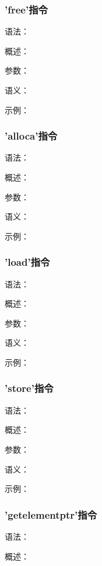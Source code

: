 \documentclass[12pt,a4paper]{article}
\begin{document}
{%

\subsubsection{'free'指令} %

语法：

概述：

参数：

语义：

示例：


\subsubsection{'alloca'指令} %

语法：

概述：

参数：

语义：

示例：


\subsubsection{'load'指令} %

语法：

概述：

参数：

语义：

示例：


\subsubsection{'store'指令} %

语法：

概述：

参数：

语义：

示例：


\subsubsection{'getelementptr'指令} %

语法：

概述：

}
\end{document}
